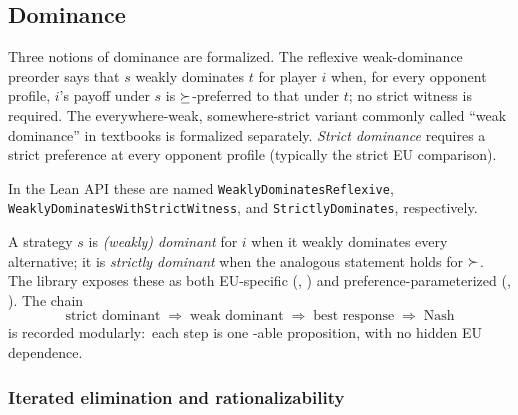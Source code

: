 
\subsection{Dominance}
\label{sec:solution-concepts:dominance}

Three notions of dominance are formalized.  The reflexive weak-dominance
preorder says that $s$ weakly dominates $t$ for player $i$ when, for every
opponent profile, $i$'s payoff under $s$ is $\succeq$-preferred to that under
$t$; no strict witness is required.  The everywhere-weak, somewhere-strict
variant commonly called ``weak dominance'' in textbooks is formalized
separately.  \emph{Strict dominance} requires a strict preference at every
opponent profile (typically the strict EU comparison).

In the Lean API these are named
\texttt{WeaklyDominatesReflexive},
\texttt{WeaklyDominatesWithStrictWitness}, and
\texttt{StrictlyDominates}, respectively.

A strategy $s$ is \emph{(weakly) dominant} for $i$ when it weakly
dominates every alternative; it is \emph{strictly dominant} when
the analogous statement holds for $\succ$.  The library exposes
these as both EU-specific (, )
and preference-parameterized (,
).  The chain
\[
  \text{strict dominant} \;\Rightarrow\; \text{weak dominant} \;\Rightarrow\;
  \text{best response} \;\Rightarrow\; \text{Nash}
\]
is recorded modularly:\ each step is one -able
proposition, with no hidden EU dependence.

\subsubsection{Iterated elimination and rationalizability}


